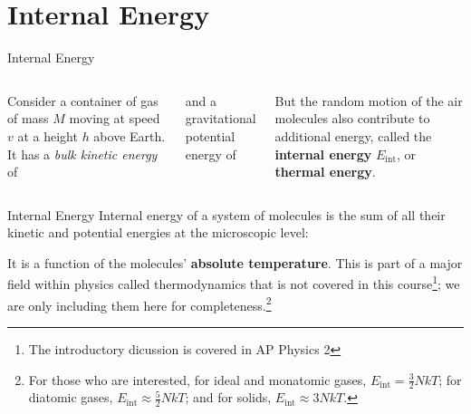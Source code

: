 \documentclass[12pt,compress,aspectratio=169]{beamer}
\begin{document}
\section{Internal Energy}

\begin{frame}{Internal Energy}
  \begin{columns}

    Consider a container of gas of mass $M$ moving at speed $v$ at a height $h$
    above Earth. It has a \emph{bulk kinetic energy} of

    
    and a gravitational potential energy of


    \vspace{-.1in}But the random motion of the air molecules also contribute to
    additional energy, called the \textbf{internal energy} $E_\text{int}$, or
    \textbf{thermal energy}.
  \end{columns}
\end{frame}



\begin{frame}{Internal Energy}
  Internal energy of a system of molecules is the sum of all their kinetic and
  potential energies at the microscopic level:
  

  It is a function of the molecules' \textbf{absolute temperature}. This is
  part of a major field within physics called thermodynamics that is not
  covered in this course\footnote{The introductory dicussion is covered in AP
  Physics 2}; we are only including them here for completeness.\footnote{For
  those who are interested, for ideal and monatomic gases,
  $E_\text{int}=\frac32NkT$; for diatomic gases, $E_\text{int}\approx\frac52NkT$;
  and for solids, $E_\text{int}\approx3NkT$. }
\end{frame}
\end{document}
